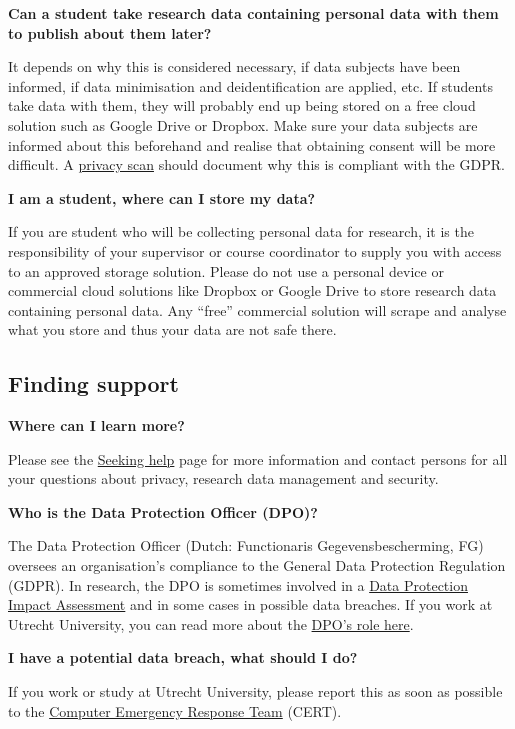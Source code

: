 \documentclass[
]{book}
\begin{document}
\textbf{Can a student take research data containing personal data with them to publish about them later?}

It depends on why this is considered necessary, if data subjects have been informed, if data minimisation and deidentification are applied, etc. If students take data with them, they will probably end up being stored on a free cloud solution such as Google Drive or Dropbox. Make sure your data subjects are informed about this beforehand and realise that obtaining consent will be more difficult. A \protect\hyperlink{privacy-scan}{privacy scan} should document why this is compliant with the GDPR.

\textbf{I am a student, where can I store my data?}

If you are student who will be collecting personal data for research, it is the responsibility of your supervisor or course coordinator to supply you with access to an approved storage solution. Please do not use a personal device or commercial cloud solutions like Dropbox or Google Drive to store research data containing personal data. Any ``free'' commercial solution will scrape and analyse what you store and thus your data are not safe there.

\hypertarget{finding-support}{%
\subsection{Finding support}\label{finding-support}}

\textbf{Where can I learn more?}

Please see the \protect\hyperlink{seeking-help}{Seeking help} page for more information and contact persons for all your questions about privacy, research data management and security.

\textbf{Who is the Data Protection Officer (DPO)?}

The Data Protection Officer (Dutch: Functionaris Gegevensbescherming, FG) oversees an organisation's compliance to the General Data Protection Regulation (GDPR). In research, the DPO is sometimes involved in a \protect\hyperlink{dpia}{Data Protection Impact Assessment} and in some cases in possible data breaches. If you work at Utrecht University, you can read more about the \href{https://intranet.uu.nl/en/knowledgebase/data-protection-officer}{DPO's role here}.

\textbf{I have a potential data breach, what should I do?}

If you work or study at Utrecht University, please report this as soon as possible to the \href{https://intranet.uu.nl/en/security/information-security-computer-misuse-or-report-incident-cert}{Computer Emergency Response Team} (CERT).
\end{document}
